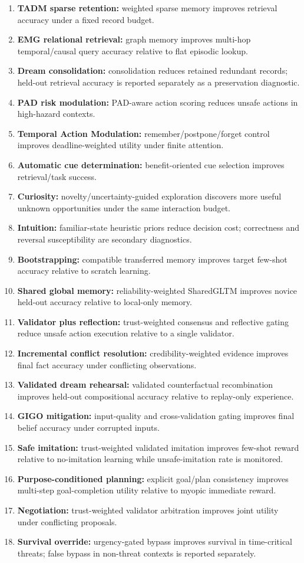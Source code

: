 \begin{enumerate}
\item \textbf{TADM sparse retention:} weighted sparse memory improves retrieval accuracy under a fixed record budget.
\item \textbf{EMG relational retrieval:} graph memory improves multi-hop temporal/causal query accuracy relative to flat episodic lookup.
\item \textbf{Dream consolidation:} consolidation reduces retained redundant records; held-out retrieval accuracy is reported separately as a preservation diagnostic.
\item \textbf{PAD risk modulation:} PAD-aware action scoring reduces unsafe actions in high-hazard contexts.
\item \textbf{Temporal Action Modulation:} remember/postpone/forget control improves deadline-weighted utility under finite attention.
\item \textbf{Automatic cue determination:} benefit-oriented cue selection improves retrieval/task success.
\item \textbf{Curiosity:} novelty/uncertainty-guided exploration discovers more useful unknown opportunities under the same interaction budget.
\item \textbf{Intuition:} familiar-state heuristic priors reduce decision cost; correctness and reversal susceptibility are secondary diagnostics.
\item \textbf{Bootstrapping:} compatible transferred memory improves target few-shot accuracy relative to scratch learning.
\item \textbf{Shared global memory:} reliability-weighted SharedGLTM improves novice held-out accuracy relative to local-only memory.
\item \textbf{Validator plus reflection:} trust-weighted consensus and reflective gating reduce unsafe action execution relative to a single validator.
\item \textbf{Incremental conflict resolution:} credibility-weighted evidence improves final fact accuracy under conflicting observations.
\item \textbf{Validated dream rehearsal:} validated counterfactual recombination improves held-out compositional accuracy relative to replay-only experience.
\item \textbf{GIGO mitigation:} input-quality and cross-validation gating improves final belief accuracy under corrupted inputs.
\item \textbf{Safe imitation:} trust-weighted validated imitation improves few-shot reward relative to no-imitation learning while unsafe-imitation rate is monitored.
\item \textbf{Purpose-conditioned planning:} explicit goal/plan consistency improves multi-step goal-completion utility relative to myopic immediate reward.
\item \textbf{Negotiation:} trust-weighted validator arbitration improves joint utility under conflicting proposals.
\item \textbf{Survival override:} urgency-gated bypass improves survival in time-critical threats; false bypass in non-threat contexts is reported separately.
\end{enumerate}
